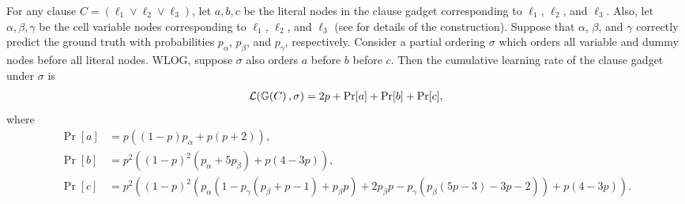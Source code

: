 \begin{lemma} \label{lemma:MD_genOrderingCLR}
    For any clause $ C = \left( \ell_1 \lor \ell_2 \lor \ell_3 \right) $, let $ a,b,c $ be the literal nodes in the clause gadget corresponding to $\ell_1$, $\ell_2$, and $\ell_3$. Also, let $ \alpha, \beta, \gamma $ be the cell variable nodes corresponding to $\ell_1$, $\ell_2$, and $\ell_3$ (see  for details of the construction). Suppose that $\alpha$, $\beta$, and $\gamma$ correctly predict the ground truth with probabilities $p_\alpha$, $p_\beta$, and $p_\gamma$, respectively.
    Consider a partial ordering $ \sigma $ which orders all variable and dummy nodes before all literal nodes. WLOG, suppose $ \sigma $ also orders $a$ before $b$ before $c$.
    Then the cumulative learning rate of the clause gadget under $\sigma$ is \begin{align*}
	\mathcal{L}(\mathbb{G}\!\left(C\right), \sigma) = 2p + \Pr[a] + \Pr[b] + \Pr[c], 
    \end{align*}
    where 
    \begin{align*}
        \Pr[a] &= p((1-p)p_\alpha + p(p+2)),\\
        \Pr[b] &= p^2 \left((1-p)^2 (p_\alpha + 5{p_\beta})+p (4-3 p)\right),\\
        \Pr[c] &= p^2 \left((1-p)^2 (p_\alpha(1-{p_\gamma} ({p_\beta}+p-1)+{p_\beta} p)+ 2p_\beta p -{p_\gamma}({p_\beta} (5 p-3)-3 p-2)) + p(4-3p)\right).
    \end{align*}
\end{lemma}


